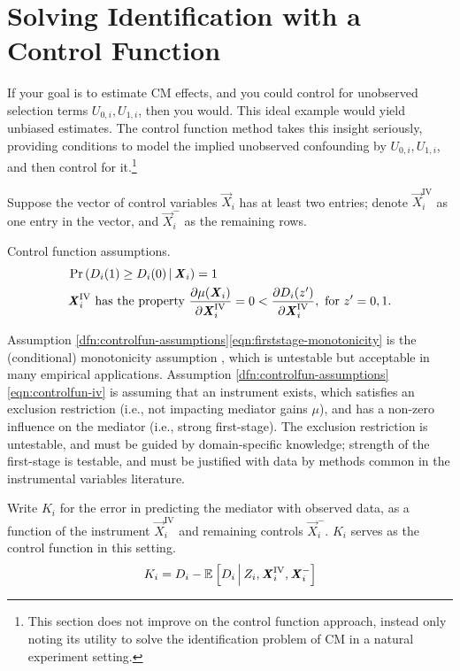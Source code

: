 \section{Solving Identification with a Control Function}
\label{sec:controlfun}
If your goal is to estimate CM effects, and you could control for unobserved selection terms $U_{0,i}, U_{1,i}$, then you would.
This ideal example would yield unbiased estimates.
The control function method takes this insight seriously, providing conditions to model the implied unobserved confounding by $U_{0,i}, U_{1,i}$, and then control for it.\footnote{
    This section does not improve on the control function approach, instead only noting its utility to solve the identification problem of CM in a natural experiment setting.
}

Suppose the vector of control variables $\vec X_i$ has at least two entries;
denote $\vec X_i^{\text{IV}}$ as one entry in the vector, and $\vec X_i^-$ as the remaining rows.
\begin{definition}
    \label{dfn:controlfun-assumptions}
    Control function assumptions.
    \begin{align}
        \label{eqn:firststage-monotonicity}
        &\Probgiven{ D_i(1) \geq D_i(0) }{\vec X_i} = 1    \\
        \label{eqn:controlfun-iv}
        &\vec X_i^{\text{IV}} \text{ has the property }
        \partialdiff[\mu(\vec X_i)]{\vec X_i^{\text{IV}}} = 0 < \partialdiff[D_i(z')]{\vec X_i^{\text{IV}}}, \textnormal{ for } z' = 0, 1.
    \end{align}
\end{definition}
Assumption \ref{dfn:controlfun-assumptions}\eqref{eqn:firststage-monotonicity} is the (conditional) monotonicity assumption \citep{imbens1994identification}, which is untestable but acceptable in many empirical applications.
Assumption \ref{dfn:controlfun-assumptions}\eqref{eqn:controlfun-iv} is assuming that an instrument exists, which satisfies an exclusion restriction (i.e., not impacting mediator gains $\mu$), and has a non-zero influence on the mediator (i.e., strong first-stage).
The exclusion restriction is untestable, and must be guided by domain-specific knowledge; strength of the first-stage is testable, and must be justified with data by methods common in the instrumental variables literature.

Write $K_i$ for the error in predicting the mediator with observed data, as a function of the instrument $\vec X_i^{\text{IV}}$ and remaining controls $\vec X_i^-$.
$K_i$ serves as the control function in this setting.
\[ K_i = D_i - \mathbb{E}_{} \left[ D_i \, \middle\vert \, Z_i, \boldsymbol{\mathit{X}}_i^{\text{IV}}, \boldsymbol{\mathit{X}}_i^- \right] \]

